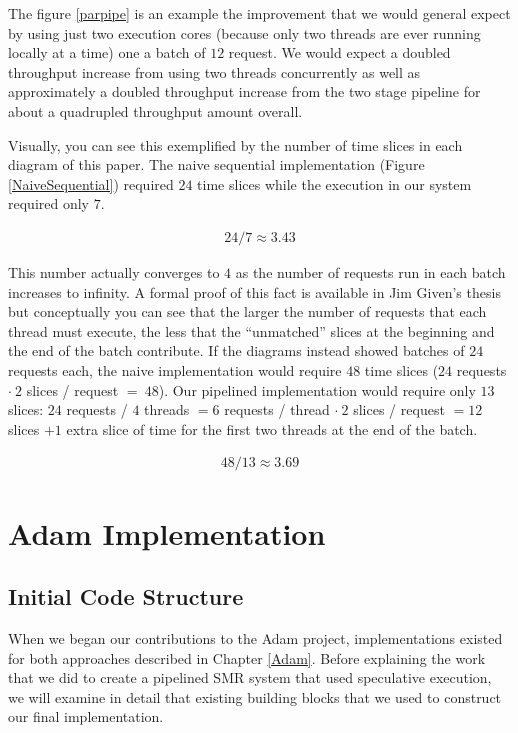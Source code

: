 \documentclass[11pt, oneside]{report}
\begin{document}
The figure \ref{parpipe} is an example the improvement that we would general expect by using just two execution cores (because only two threads are ever running locally at a time) one a batch of $12$ request.
We would expect a doubled throughput increase from using two threads concurrently as well as approximately a doubled throughput increase from the two stage pipeline for about a quadrupled throughput amount overall.

Visually, you can see this exemplified by the number of time slices in each diagram of this paper.
The naive sequential implementation (Figure \ref{NaiveSequential}) required $24$ time slices while the execution in our system required only $7$.

\begin{align*}
24 / 7 \approx 3.43
\end{align*}

This number actually converges to $4$ as the number of requests run in each batch increases to infinity.
A formal proof of this fact is available in Jim Given's thesis but conceptually you can see that the larger the number of requests that each thread must execute, the less that the ``unmatched'' slices at the beginning and the end of the batch contribute. 
If the diagrams instead showed batches of $24$ requests each, the naive implementation would require $48$ time slices ($24$ requests $\cdot \ 2$ slices / request $=\ 48$).
Our pipelined implementation would require only $13$ slices: $24$ requests / $4$ threads $ = 6$ requests / thread $\cdot \ 2$ slices / request $ = 12$ slices $ + 1$ extra slice of time for the first two threads at the end of the batch. 

\begin{align*}
48 / 13 \approx 3.69
\end{align*}

\chapter{Adam Implementation}\label{AdamImplementation}

\section{Initial Code Structure}\label{existing}

When we began our contributions to the Adam project, implementations existed for both approaches described in Chapter \ref{Adam}. 
Before explaining the work that we did to create a pipelined SMR system that used speculative execution, we will examine in detail that existing building blocks that we used to construct our final implementation.
\end{document}
